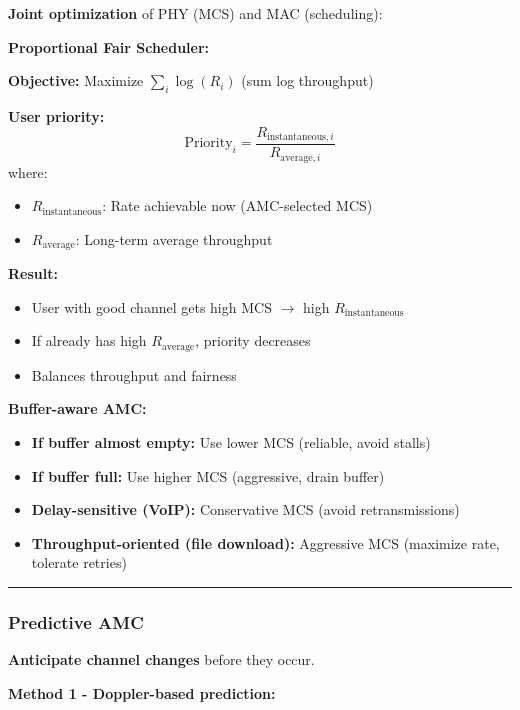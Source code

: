 \textbf{Joint optimization} of PHY (MCS) and MAC (scheduling):

\textbf{Proportional Fair Scheduler:}

\textbf{Objective:} Maximize $\sum_{i} \log(R_i)$ (sum log throughput)

\textbf{User priority:}
\begin{equation*}
\text{Priority}_i = \frac{R_{\text{instantaneous},i}}{R_{\text{average},i}}
\end{equation*}
where:
\begin{itemize}
\item $R_{\text{instantaneous}}$: Rate achievable now (AMC-selected MCS)
\item $R_{\text{average}}$: Long-term average throughput
\end{itemize}

\textbf{Result:}
\begin{itemize}
\item User with good channel gets high MCS $\rightarrow$ high $R_{\text{instantaneous}}$
\item If already has high $R_{\text{average}}$, priority decreases
\item Balances throughput and fairness
\end{itemize}

\textbf{Buffer-aware AMC:}
\begin{itemize}
\item \textbf{If buffer almost empty:} Use lower MCS (reliable, avoid stalls)
\item \textbf{If buffer full:} Use higher MCS (aggressive, drain buffer)
\item \textbf{Delay-sensitive (VoIP):} Conservative MCS (avoid retransmissions)
\item \textbf{Throughput-oriented (file download):} Aggressive MCS (maximize rate, tolerate retries)
\end{itemize}

\begin{center}\rule{0.5\linewidth}{0.5pt}\end{center}

\subsubsection{Predictive AMC}\label{predictive-amc}

\textbf{Anticipate channel changes} before they occur.

\textbf{Method 1 - Doppler-based prediction:}

